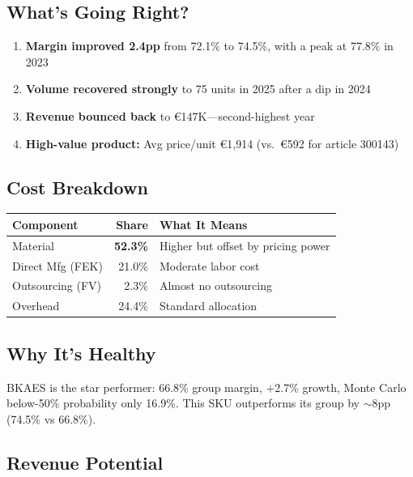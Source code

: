 \documentclass[11pt,a4paper]{article}
\newcommand{\EUR}{\euro{}}
\newcommand{\pp}{pp}
\begin{document}
\subsection{What's Going Right?}

\begin{enumerate}[nosep]
  \item \textbf{Margin improved 2.4\pp{}} from 72.1\% to 74.5\%, with a peak at 77.8\% in 2023
  \item \textbf{Volume recovered strongly} to 75 units in 2025 after a dip in 2024
  \item \textbf{Revenue bounced back} to \EUR147K---second-highest year
  \item \textbf{High-value product:} Avg price/unit \EUR1{,}914 (vs.\ \EUR592 for article 300143)
\end{enumerate}

\subsection{Cost Breakdown}

\begin{table}[H]
\centering
\begin{tabular}{lrl}
\toprule
\textbf{Component} & \textbf{Share} & \textbf{What It Means} \\
\midrule
Material         & \textbf{52.3\%} & Higher but offset by pricing power \\
Direct Mfg (FEK) & 21.0\%          & Moderate labor cost \\
Outsourcing (FV) & 2.3\%            & Almost no outsourcing \\
Overhead         & 24.4\%           & Standard allocation \\
\bottomrule
\end{tabular}
\end{table}

\subsection{Why It's Healthy}

BKAES is the star performer: 66.8\% group margin, +2.7\% growth, Monte Carlo below-50\% probability only 16.9\%. This SKU outperforms its group by $\sim$8\pp{} (74.5\% vs 66.8\%).

\subsection{Revenue Potential}
\end{document}
